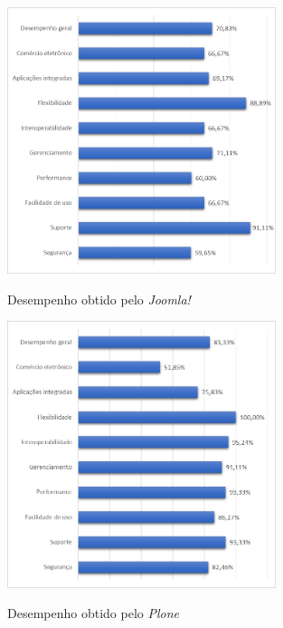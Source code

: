 \begin{figure}[htb]
 \centering
 \caption{Desempenho obtido pelo \textit{Joomla!}}
 \includegraphics[width=0.7\textwidth]{figuras/desempenho-joomla}
 \label{joomla}
\end{figure}
\newpage
\begin{figure}[htb]
 \centering
 \caption{Desempenho obtido pelo \textit{Plone}}
 \includegraphics[width=0.7\textwidth]{figuras/desempenho-plone}
 \label{plone}
\end{figure}
\newpage

